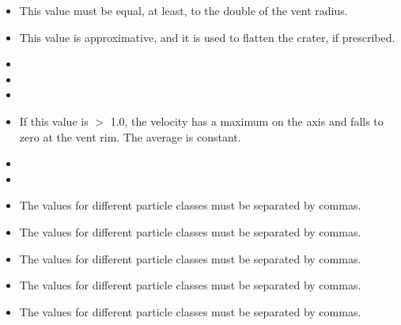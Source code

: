 \begin{itemize}
\item
{}
{This value must be equal, at least, to the double of the vent radius.}

\item
{}
{This value is approximative, and it is used to flatten the crater, if prescribed.}

\item
{}
{}

\item
{}
{}

\item
{}
{}

\item
{}
{If this value is $>$ 1.0, the velocity has a maximum on the axis and falls to zero at the vent rim. The average is constant.}

\item
{}
{}

\item
{}

\item
{}
{The values for different particle classes must be separated by commas.}

\item
{}
{The values for different particle classes must be separated by commas.}

\item
{}
{The values for different particle classes must be separated by commas.}

\item
{}
{The values for different particle classes must be separated by commas.}

\item
{}
{The values for different particle classes must be separated by commas.}


\end{itemize}
